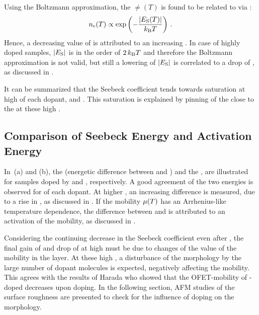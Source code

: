 Using the Boltzmann approximation, the \neLong $\ne(T)$ is found to be related to \Es via :
\begin{equation*}
\ne(T) \propto \exp{-\frac{|\Es(T)|}{\kT}}
\PUNKT
\end{equation*}
Hence, a decreasing value of \Es is attributed to an increasing \neLong.
In case of highly doped samples, $|\Es|$ is in the order of \mbox{$2\,k_\text{B}T$} and therefore the Boltzmann approximation is not valid, but still a lowering of $|\Es|$ is correlated to a drop of \ne, as discussed in .

It can be summarized that the Seebeck coefficient tends towards saturation at high \CLongs of each dopant, \CrPd and \WPd. This saturation is explained by pinning of the \EfLong close to the \EtLong at these high \CLongs.

\subsection{Comparison of Seebeck Energy and Activation Energy}
\label{sec:ResPd-EsEact}
%
In \,(a) and (b), the \EsLongL (energetic difference between \EfLongL and \EtLongL) and the \EactLongL, are illustrated for samples doped by \CrPd and \WPd, respectively. A good agreement of the two energies is observed for  of each dopant. At higher \CLongs, an increasing difference is measured, due to a rise in \Eact, as discussed in . %
If the mobility $\mob(T)$ has an Arrhenius-like temperature dependence, the difference between \Eact and \Es is attributed to an activation of the mobility, as discussed in .

Considering the continuing decrease in the Seebeck coefficient even after \C[0.100], the final gain of \Eact and drop of \cLong at high \CLongs must be due to changes of the value of the mobility in the layer.
At these high \C, a disturbance of the morphology by the large number of dopant molecules is expected, negatively affecting the mobility.
This agrees with the results of Harada\etal\cite{Harada2007} who showed that the OFET-mobility of \aob-doped \CS decreases upon doping. In the following section, AFM studies of the surface roughness are presented to check for the influence of doping on the morphology.

